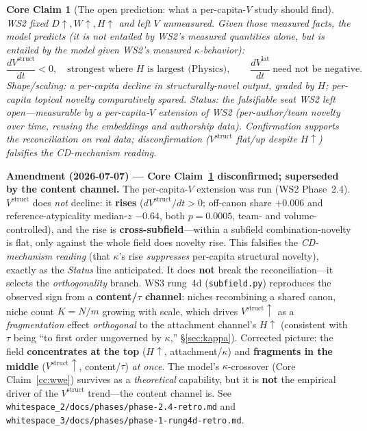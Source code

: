 \documentclass[11pt,letterpaper]{article}
\theoremstyle{definition}
\theoremstyle{plain}
\newtheorem{coreclaim}{Core Claim}
\begin{document}
\begin{coreclaim}[The open prediction: what a per-capita-$V$ study should find]\label{cc:open}
WS2 fixed $D\!\uparrow, W\!\uparrow, H\!\uparrow$ and left $V$ unmeasured. Given
those measured facts, the model \emph{predicts} (it is not entailed by WS2's
measured quantities alone, but is entailed by the model \emph{given} WS2's
measured $\kappa$-behavior):
\[
  \frac{dV^{\mathrm{struct}}}{dt} < 0,
  \quad\text{strongest where } H \text{ is largest (Physics)}, \qquad
  \frac{dV^{\mathrm{lat}}}{dt}\ \text{need not be negative.}
\]
\emph{Shape/scaling:} a per-capita decline in \emph{structurally}-novel output,
graded by $H$; per-capita \emph{topical} novelty comparatively spared.
\emph{Status:} the falsifiable seat WS2 left open---measurable by a per-capita-$V$
extension of WS2 (per-author/team novelty over time, reusing the embeddings and
authorship data). Confirmation supports the reconciliation on real data;
disconfirmation ($V^{\mathrm{struct}}$ flat/up despite $H\uparrow$) falsifies the
CD-mechanism reading.
\end{coreclaim}

\medskip\noindent\textbf{Amendment (2026-07-07) --- Core Claim~\ref{cc:open}
disconfirmed; superseded by the content channel.} The per-capita-$V$ extension was run
(WS2 Phase~2.4). $V^{\mathrm{struct}}$ does \emph{not} decline: it \textbf{rises}
($dV^{\mathrm{struct}}/dt>0$; off-canon share $+0.006$ and reference-atypicality
median-$z$ $-0.64$, both $p{=}0.0005$, team- and volume-controlled), and the rise is
\textbf{cross-subfield}---within a subfield combination-novelty is flat, only against the
whole field does novelty rise. This falsifies the \emph{CD-mechanism reading} (that
$\kappa$'s rise \emph{suppresses} per-capita structural novelty), exactly as the
\emph{Status} line anticipated. It does \textbf{not} break the reconciliation---it selects
the \emph{orthogonality} branch. WS3 rung~4d (\texttt{subfield.py}) reproduces the observed
sign from a \textbf{content/$\tau$ channel}: niches recombining a shared canon, niche count
$K=N/m$ growing with scale, which drives $V^{\mathrm{struct}}\!\uparrow$ as a
\emph{fragmentation} effect \emph{orthogonal} to the attachment channel's $H\!\uparrow$
(consistent with $\tau$ being ``to first order ungoverned by $\kappa$,''
\S\ref{sec:kappa}). Corrected picture: the field \textbf{concentrates at the top}
($H\!\uparrow$, attachment/$\kappa$) and \textbf{fragments in the middle}
($V^{\mathrm{struct}}\!\uparrow$, content/$\tau$) \emph{at once}. The model's
$\kappa$-crossover (Core Claim~\ref{cc:wwe}) survives as a \emph{theoretical} capability,
but it is \textbf{not} the empirical driver of the $V^{\mathrm{struct}}$ trend---the
content channel is. See \texttt{whitespace\_2/docs/phases/phase-2.4-retro.md} and
\texttt{whitespace\_3/docs/phases/phase-1-rung4d-retro.md}.
\end{document}
